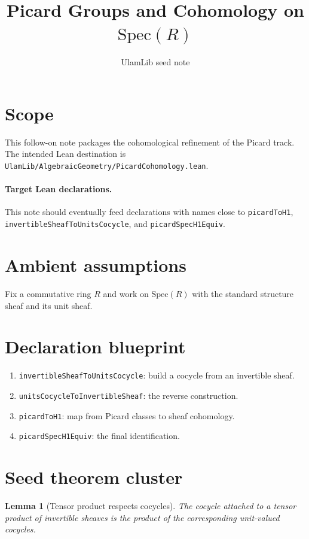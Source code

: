 \documentclass[11pt]{article}
\title{Picard Groups and Cohomology on $\mathrm{Spec}(R)$}
\author{UlamLib seed note}
\date{}
\newtheorem{lemma}[definition]{Lemma}
\begin{document}
\maketitle

\section{Scope}

This follow-on note packages the cohomological refinement of the Picard track.
The intended Lean destination is
\texttt{UlamLib/AlgebraicGeometry/PicardCohomology.lean}.

\paragraph{Target Lean declarations.}
This note should eventually feed declarations with names close to
\texttt{picardToH1}, \texttt{invertibleSheafToUnitsCocycle}, and
\texttt{picardSpecH1Equiv}.

\section{Ambient assumptions}

Fix a commutative ring $R$ and work on $\mathrm{Spec}(R)$ with the standard
structure sheaf and its unit sheaf.

\section{Declaration blueprint}

\begin{enumerate}
\item \texttt{invertibleSheafToUnitsCocycle}: build a cocycle from an
invertible sheaf.
\item \texttt{unitsCocycleToInvertibleSheaf}: the reverse construction.
\item \texttt{picardToH1}: map from Picard classes to sheaf cohomology.
\item \texttt{picardSpecH1Equiv}: the final identification.
\end{enumerate}

\section{Seed theorem cluster}

\begin{lemma}[Tensor product respects cocycles]\label{lem:tensor-respects-cocycles}
The cocycle attached to a tensor product of invertible sheaves is the product
of the corresponding unit-valued cocycles.
\end{lemma}
\end{document}
